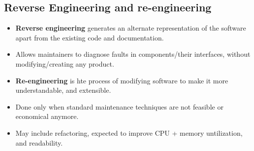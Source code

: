 \documentclass{article}
\begin{document}
\subsection{Reverse Engineering and re-engineering}
\begin{itemize}
    \item \textbf{Reverse engineering} generates an alternate representation of the software apart from the existing code and documentation. 
    
    \item Allows maintainers to diagnose faults in components/their interfaces, without modifying/creating any product. 
    
    \item \textbf{Re-engineering} is hte process of modifying software to make it more understandable, and extensible. 
    
    \item Done only when standard maintenance techniques are not feasible or economical anymore. 
    
    \item May include refactoring, expected to improve CPU + memory untilization, and readability. 
\end{itemize}
\end{document}
